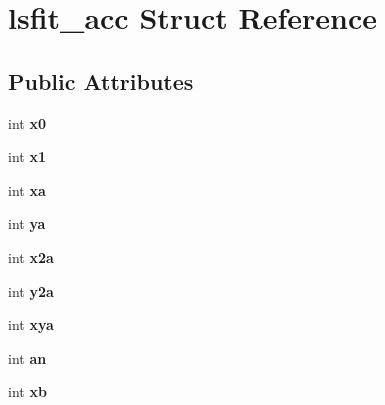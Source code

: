 \hypertarget{structlsfit__acc}{\section{lsfit\+\_\+acc Struct Reference}
\label{structlsfit__acc}
}
\subsection*{Public Attributes}
\begin{DoxyCompactItemize}
\item 
\hypertarget{structlsfit__acc_a74726b2c76f9e7ccd8f7c70b24e679e2}{int {\bfseries x0}}\label{structlsfit__acc_a74726b2c76f9e7ccd8f7c70b24e679e2}

\item 
\hypertarget{structlsfit__acc_a81222dea0374164b72030f27b3fc0eb3}{int {\bfseries x1}}\label{structlsfit__acc_a81222dea0374164b72030f27b3fc0eb3}

\item 
\hypertarget{structlsfit__acc_aca2a73c1ac7e72c7a256e6128a7fdc0f}{int {\bfseries xa}}\label{structlsfit__acc_aca2a73c1ac7e72c7a256e6128a7fdc0f}

\item 
\hypertarget{structlsfit__acc_a26e05cb633bf0845ad123ca3bf432061}{int {\bfseries ya}}\label{structlsfit__acc_a26e05cb633bf0845ad123ca3bf432061}

\item 
\hypertarget{structlsfit__acc_a14c369e28b59a48a2a3c70c80ab3bce3}{int {\bfseries x2a}}\label{structlsfit__acc_a14c369e28b59a48a2a3c70c80ab3bce3}

\item 
\hypertarget{structlsfit__acc_ae6408438922bd96bfc0008fee1e2f43c}{int {\bfseries y2a}}\label{structlsfit__acc_ae6408438922bd96bfc0008fee1e2f43c}

\item 
\hypertarget{structlsfit__acc_a7479d7df5f1f76eb38f020598dc347ed}{int {\bfseries xya}}\label{structlsfit__acc_a7479d7df5f1f76eb38f020598dc347ed}

\item 
\hypertarget{structlsfit__acc_ad21459eeaddd7da027130b622e02bad9}{int {\bfseries an}}\label{structlsfit__acc_ad21459eeaddd7da027130b622e02bad9}

\item 
\hypertarget{structlsfit__acc_a63109c854fc23e51337513344e3c1266}{int {\bfseries xb}}\label{structlsfit__acc_a63109c854fc23e51337513344e3c1266}


\end{DoxyCompactItemize}
